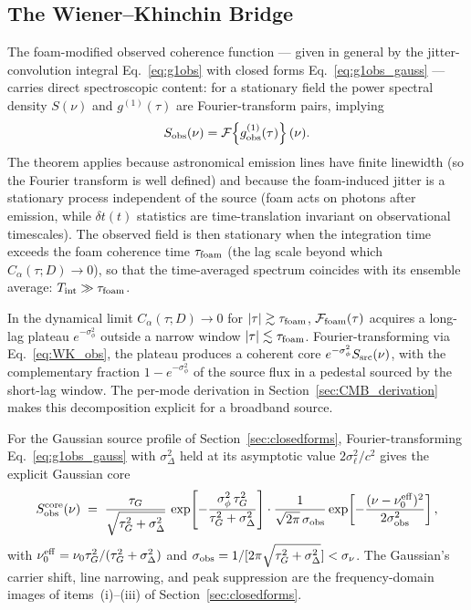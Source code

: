 \documentclass[aps,prd,onecolumn,amsmath,amssymb]{revtex4-2}
\begin{document}
\subsection{The Wiener--Khinchin Bridge}

The foam-modified observed coherence function — given in general by the
jitter-convolution integral Eq.~\eqref{eq:g1obs} with closed forms
Eq.~\eqref{eq:g1obs_gauss} — carries direct
spectroscopic content: for a stationary field the power spectral density
$S(\nu)$ and $g^{(1)}(\tau)$ are Fourier-transform pairs,
implying
\begin{equation}
  S_{\rm obs}(\nu) = \mathcal{F}\!\left\{g^{(1)}_{\rm obs}(\tau)\right\}(\nu).
  \label{eq:WK_obs}
\end{equation}
The theorem applies because astronomical emission lines have finite
linewidth (so the Fourier transform is well defined) and because the
foam-induced jitter is a stationary process independent of the source
(foam acts on photons after emission, while $\delta t(t)$ statistics are
time-translation invariant on observational timescales).  The observed
field is then stationary when the integration time exceeds the foam
coherence time $\tau_{\rm foam}$ (the lag scale beyond which
$C_\alpha(\tau;D)\to 0$), so that the time-averaged spectrum coincides
with its ensemble average: $T_{\rm int}\gg\tau_{\rm foam}$.

In the dynamical limit $C_\alpha(\tau;D)\to 0$ for
$|\tau|\gtrsim\tau_{\rm foam}$, $\mathcal{F}_{\rm foam}(\tau)$ acquires
a long-lag plateau $e^{-\sigma_\phi^2}$ outside a narrow window
$|\tau|\lesssim\tau_{\rm foam}$.  Fourier-transforming via
Eq.~\eqref{eq:WK_obs}, the plateau produces a coherent core
$e^{-\sigma_\phi^2}S_{\rm src}(\nu)$, with the complementary fraction
$1-e^{-\sigma_\phi^2}$ of the source flux in a pedestal sourced by the
short-lag window.  The per-mode derivation in
Section~\ref{sec:CMB_derivation} makes this decomposition explicit for
a broadband source.

For the Gaussian source profile of Section~\ref{sec:closedforms},
Fourier-transforming Eq.~\eqref{eq:g1obs_gauss} with $\sigma_\Delta^2$
held at its asymptotic value $2\sigma_\ell^2/c^2$ gives the explicit
Gaussian core
\begin{equation}
  S_{\rm obs}^{\rm core}(\nu) \;=\;
    \frac{\tau_G}{\sqrt{\tau_G^2+\sigma_\Delta^2}}\,
    \exp\!\left[-\frac{\sigma_\phi^2\,\tau_G^2}{\tau_G^2+\sigma_\Delta^2}\right]
    \cdot
    \frac{1}{\sqrt{2\pi}\,\sigma_{\rm obs}}
    \exp\!\left[-\frac{(\nu-\nu_0^{\rm eff})^2}{2\sigma_{\rm obs}^2}\right],
  \label{eq:Sobs_gauss}
\end{equation}
with $\nu_0^{\rm eff}=\nu_0\tau_G^2/(\tau_G^2+\sigma_\Delta^2)$ and
$\sigma_{\rm obs}=1/[2\pi\sqrt{\tau_G^2+\sigma_\Delta^2}]<\sigma_\nu$.
The Gaussian's carrier shift, line narrowing, and peak suppression are
the frequency-domain images of items~(i)--(iii) of
Section~\ref{sec:closedforms}.
\end{document}
